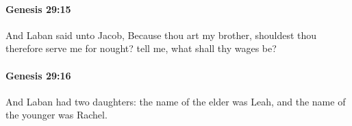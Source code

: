 		\paragraph{Genesis 29:15} %
			\label{GENESIS-29-15}

			And Laban said unto Jacob, Because thou art my brother, shouldest thou therefore serve me for nought? tell me, what shall thy wages be?


		\paragraph{Genesis 29:16} %
			\label{GENESIS-29-16}

			And Laban had two daughters: the name of the elder was Leah, and the name of the younger was Rachel.


